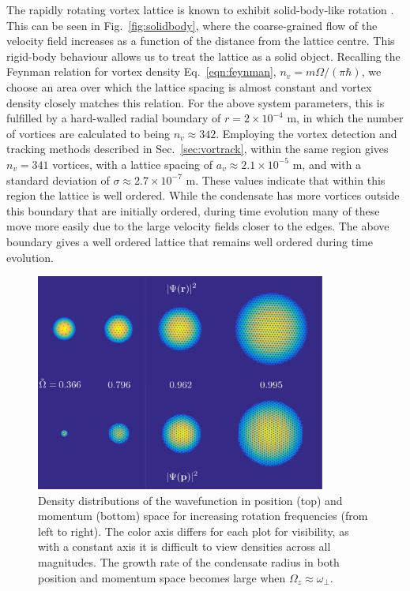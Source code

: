 The rapidly rotating vortex lattice is known to exhibit solid-body-like rotation \cite{Vtx:AboShaeer_sci_2001}. This can be seen in Fig.~\ref{fig:solidbody}, where the coarse-grained flow of the velocity field increases as a function of the distance from the lattice centre. This rigid-body behaviour allows us to treat the lattice as a solid object. Recalling the Feynman relation for vortex density Eq.~\eqref{eqn:feynman}, $n_v = m\Omega/(\pi\hbar)$, we choose an area over which the lattice spacing is almost constant and vortex density closely matches this relation. For the above system parameters, this is fulfilled by a hard-walled radial boundary of $r=2\times 10^{-4}$ m, in which the number of vortices are calculated to being $n_v \approx 342$. Employing the vortex detection and tracking methods described in Sec.~\ref{sec:vortrack}, within the same region gives $n_v = 341$ vortices, with a lattice spacing of $a_v \approx 2.1\times 10^{-5}$ m, and with a standard deviation of $\sigma \approx 2.7 \times 10^{-7}$ m. These values indicate that within this region the lattice is well ordered. While the condensate has more vortices outside this boundary that are initially ordered, during time evolution many of these move more easily due to the large velocity fields closer to the edges. The above boundary gives a well ordered lattice that remains well ordered during time evolution.

\begin{figure}\centering
    \includegraphics[width=0.85\textwidth]{Images/ch4_vtx/ramp_omega_2.pdf}
    \caption{Density distributions of the wavefunction in position (top) and momentum (bottom) space for increasing rotation frequencies (from left to right). The color axis differs for each plot for visibility, as with a constant axis it is difficult to view densities across all magnitudes. The growth rate of the condensate radius in both position and momentum space becomes large when $\Omega_z \approx \omega_\perp$.}
    \label{fig:inc_omega}
\end{figure}


